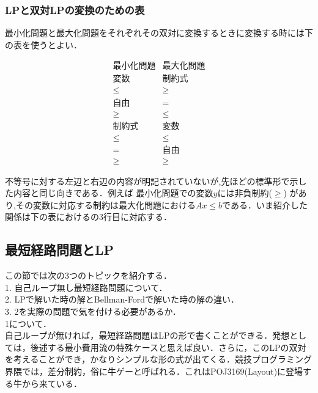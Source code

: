 \documentclass[13pt]{jarticle}
\theoremstyle{nonitalic} %
\begin{document}
\subsubsection{LPと双対LPの変換のための表}

最小化問題と最大化問題をそれぞれその双対に変換するときに変換する時には下の表を使うとよい．

\begin{equation*}
\begin{array}{c|c}
  \textrm{最小化問題} &  \textrm{最大化問題} \\ \hline \hline
  \textrm{変数} &  \textrm{制約式} \\ \hline
  \leq & \geq \\
  \textrm{自由} & = \\
  \geq & \leq \\ \hline \hline
  \textrm{制約式} & \textrm{変数} \\ \hline
  \leq & \leq \\
   =   & \textrm{自由} \\
  \geq & \geq
\end{array}
\end{equation*}

不等号に対する左辺と右辺の内容が明記されていないが,先ほどの標準形で示した内容と同じ向きである．例えば 最小化問題での変数$y$には非負制約($ \geq$) があり,その変数に対応する制約は最大化問題における$Ax \leq b$である．いま紹介した関係は下の表におけるの3行目に対応する．

\subsection{最短経路問題とLP}

この節では次の3つのトピックを紹介する． \\
1. 自己ループ無し最短経路問題について． \\
2. LPで解いた時の解とBellman-Fordで解いた時の解の違い．\\
3. 2を実際の問題で気を付ける必要があるか．
\\

1について．\\
自己ループが無ければ，最短経路問題はLPの形で書くことができる．発想としては，後述する最小費用流の特殊ケースと思えば良い．さらに，このLPの双対を考えることができ，かなりシンプルな形の式が出てくる．競技プログラミング界隈では，差分制約，俗に牛ゲーと呼ばれる．これはPOJ3169(Layout)に登場する牛から来ている． \\
\end{document}
